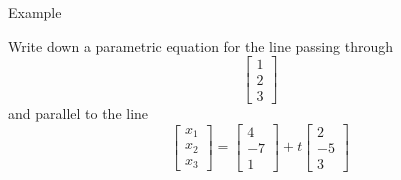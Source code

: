 \documentclass{beamer}
\begin{document}
\begin{frame}{Example}
   \begin{example}
    Write down a parametric equation for the line passing through
    \begin{equation*}
      \left[
	\begin{array}{c}
          1\\
          2\\
          3
	\end{array}
      \right]
    \end{equation*}
    and parallel to the line
    \begin{equation*}
      \left[
	\begin{array}{c}
          x_1\\
          x_2\\
          x_3
	\end{array}
      \right] = \left[
	\begin{array}{c}
          4\\
          -7\\
          1
	\end{array}
      \right]+t \left[
	\begin{array}{c}
          2\\
          -5\\
          3
	\end{array}
      \right]
    \end{equation*}
  \end{example}
\end{frame}
\end{document}
